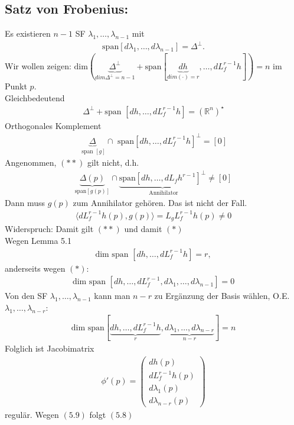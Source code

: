 \documentclass[ngerman]{tudscrreprt}
\begin{document}
\subsection*{Satz von Frobenius:} Es existieren $n-1$ SF  $\lambda_1, \dots, \lambda_{n-1}$ mit \begin{align*}\text{span} [d\lambda_1,\dots, d\lambda_{n-1}] = \Delta^\perp . \tag{5.9}\end{align*}
Wir wollen zeigen:
$\text{dim} (\underbrace{\Delta^{\perp}}_{dim \Delta^\perp = n-1} + \text{span}[\underbrace{dh}_{dim(\cdot) = r},\dots,dL_f^{r-1}h ]) = n$
im Punkt $p$.\\
Gleichbedeutend \begin{align*}\Delta^{\perp} + \text{span } [dh,\dots, dL_f^{r-1} h] = (\mathbb{R}^n)^\star \tag{*}\end{align*}
Orthogonales Komplement
\begin{align*}\underbrace{\Delta}_{\text{ span } [g]} \cap \text{ span} [dh, \dots, dL_f^{r-1} h]^{\perp} = [0] \tag{**} \end{align*}
Angenommen, $(**)$ gilt nicht, d.h. \begin{align*}
\underbrace{\Delta(p)}_{\text{span}[g(p)]} \cap \underbrace{\text{span}[dh, \dots, dL_f h^{r-1} ]^{\perp}}_{\text{ Annihilator}} \ne [0] \end{align*}
Dann muss $g(p)$ zum Annihilator gehören. Das ist nicht der Fall. \begin{align*}
\langle dL_f^{r-1} h(p) , g(p) \rangle = L_g L_f^{r-1} h(p)\ne 0
\end{align*}
Widerspruch: Damit gilt $(**)$ und damit $(*)$\\ 
Wegen Lemma 5.1 \begin{align*}
\text{dim span }[dh, \dots, dL_f^{r-1} h] = r,
\end{align*}anderseits wegen $(*)$: \\ 
\begin{align*} \text{dim span } [dh, \dots, dL_f^{r-1} ,d\lambda_1,\dots, d\lambda_{n-1}] = 0\end{align*}
Von den SF $\lambda_1,\dots, \lambda_{n-1} $ kann man $n-r$ zu Ergänzung der Basis wählen, O.E. $\lambda_1,\dots,\lambda_{n-r}:$
\begin{align*}
\text{dim span}[\underbrace{ dh, \dots, dL_f^{r-1}h }_{r}, \underbrace{d\lambda_1,\dots,d\lambda_{n-r}}_{n-r}] = n
\end{align*}
Folglich ist Jacobimatrix \begin{align*}
\phi'(p) = \begin{pmatrix} dh(p)\\ dL_f^{r-1} h(p)\\ d\lambda_1(p)\\ d\lambda_{n-r}(p) \end{pmatrix} \end{align*} regulär. Wegen $(5.9)$ folgt $(5.8)$
\end{document}
